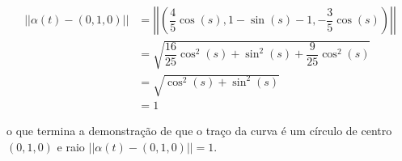 \documentclass[12pt,letterpaper]{article}
\begin{document}
\begin{enumerate}
	\begin{align*}
		||\alpha(t)-(0,1,0)||&=\left|\left|\left(\dfrac45\cos(s),1-\sin(s)-1,-\dfrac35\cos(s)\right)\right|\right|\\
		&=\sqrt{\dfrac{16}{25}\cos^2(s)+\sin^2(s)+\dfrac{9}{25}\cos^2(s)}\\
		&=\sqrt{\cos^2(s)+\sin^2(s)}\\
		&=1
	\end{align*}

	o que termina a demonstração de que o traço da curva é um círculo de centro $(0,1,0)$ e raio $||\alpha(t)-(0,1,0)||=1$.
	\end{enumerate}

	
	\newpage



\end{document}
